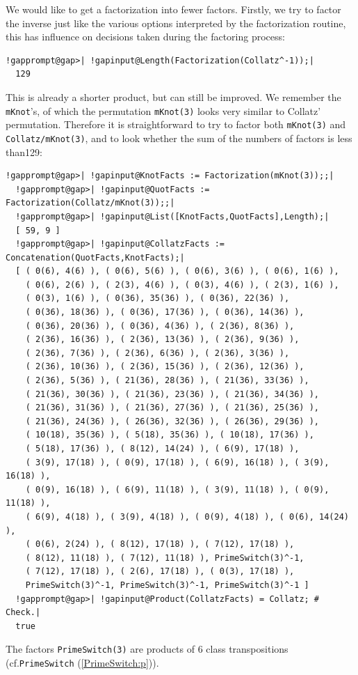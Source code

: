 \documentclass[a4paper,11pt]{report}
\begin{document}
{{ We would like to get a factorization into fewer factors. Firstly, we try to
factor the inverse \texttt{}\texttt{} just like the
various options interpreted by the factorization routine, this has influence
on decisions taken during the factoring process: 
\begin{Verbatim}[commandchars=!@|,fontsize=\small,frame=single,label=Example]
  !gapprompt@gap>| !gapinput@Length(Factorization(Collatz^-1));|
  129
\end{Verbatim}
 This is already a shorter product, but can still be improved. We remember the \texttt{mKnot}'s, of which the permutation \texttt{mKnot(3)} looks very similar to Collatz' permutation. Therefore it is straightforward to
try to factor both \texttt{mKnot(3)} and \texttt{Collatz/mKnot(3)}, and to look whether the sum of the numbers of factors is less
than{\nobreakspace}129: 
\begin{Verbatim}[commandchars=!@|,fontsize=\small,frame=single,label=Example]
  !gapprompt@gap>| !gapinput@KnotFacts := Factorization(mKnot(3));;|
  !gapprompt@gap>| !gapinput@QuotFacts := Factorization(Collatz/mKnot(3));;|
  !gapprompt@gap>| !gapinput@List([KnotFacts,QuotFacts],Length);|
  [ 59, 9 ]
  !gapprompt@gap>| !gapinput@CollatzFacts := Concatenation(QuotFacts,KnotFacts);|
  [ ( 0(6), 4(6) ), ( 0(6), 5(6) ), ( 0(6), 3(6) ), ( 0(6), 1(6) ), 
    ( 0(6), 2(6) ), ( 2(3), 4(6) ), ( 0(3), 4(6) ), ( 2(3), 1(6) ), 
    ( 0(3), 1(6) ), ( 0(36), 35(36) ), ( 0(36), 22(36) ), 
    ( 0(36), 18(36) ), ( 0(36), 17(36) ), ( 0(36), 14(36) ), 
    ( 0(36), 20(36) ), ( 0(36), 4(36) ), ( 2(36), 8(36) ), 
    ( 2(36), 16(36) ), ( 2(36), 13(36) ), ( 2(36), 9(36) ), 
    ( 2(36), 7(36) ), ( 2(36), 6(36) ), ( 2(36), 3(36) ), 
    ( 2(36), 10(36) ), ( 2(36), 15(36) ), ( 2(36), 12(36) ), 
    ( 2(36), 5(36) ), ( 21(36), 28(36) ), ( 21(36), 33(36) ), 
    ( 21(36), 30(36) ), ( 21(36), 23(36) ), ( 21(36), 34(36) ), 
    ( 21(36), 31(36) ), ( 21(36), 27(36) ), ( 21(36), 25(36) ), 
    ( 21(36), 24(36) ), ( 26(36), 32(36) ), ( 26(36), 29(36) ), 
    ( 10(18), 35(36) ), ( 5(18), 35(36) ), ( 10(18), 17(36) ), 
    ( 5(18), 17(36) ), ( 8(12), 14(24) ), ( 6(9), 17(18) ), 
    ( 3(9), 17(18) ), ( 0(9), 17(18) ), ( 6(9), 16(18) ), ( 3(9), 16(18) ),
    ( 0(9), 16(18) ), ( 6(9), 11(18) ), ( 3(9), 11(18) ), ( 0(9), 11(18) ),
    ( 6(9), 4(18) ), ( 3(9), 4(18) ), ( 0(9), 4(18) ), ( 0(6), 14(24) ), 
    ( 0(6), 2(24) ), ( 8(12), 17(18) ), ( 7(12), 17(18) ), 
    ( 8(12), 11(18) ), ( 7(12), 11(18) ), PrimeSwitch(3)^-1, 
    ( 7(12), 17(18) ), ( 2(6), 17(18) ), ( 0(3), 17(18) ), 
    PrimeSwitch(3)^-1, PrimeSwitch(3)^-1, PrimeSwitch(3)^-1 ]
  !gapprompt@gap>| !gapinput@Product(CollatzFacts) = Collatz; # Check.|
  true
\end{Verbatim}
 The factors \texttt{PrimeSwitch(3)} are products of 6 class transpositions (cf.{\nobreakspace}\texttt{PrimeSwitch} (\ref{PrimeSwitch:p})). 

}}
\end{document}
